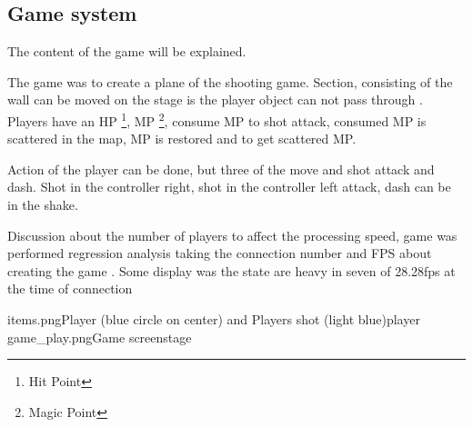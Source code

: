 \subsection{Game system}

The content of the game will be explained.

The game was to create a plane of the shooting game. Section, consisting of the wall can be moved on the stage is the player  object can not pass through .
Players have an HP \footnote{Hit Point}, MP \footnote{Magic Point}, consume MP to shot attack, consumed MP is scattered in the map, MP is restored and to get scattered MP.

Action of the player can be done, but three of the move and shot attack and dash. Shot in the controller right, shot in the controller left attack, dash can be in the shake.

Discussion about the number of players to affect the processing speed, game was performed regression analysis taking the connection number and FPS about creating the game .
Some display was the state are heavy in seven of 28.28fps at the time of connection

\myfigtwo
{items.png}{Player (blue circle on center) and Players shot (light blue)}{player}
{game_play.png}{Game screen}{stage}


